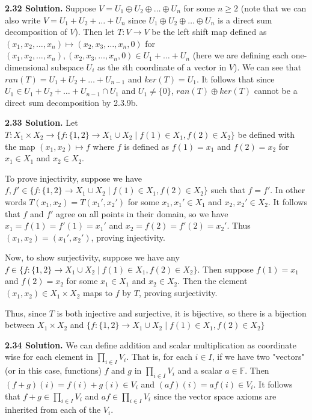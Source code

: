 \textbf{2.32 Solution.} Suppose $V = U_1 \oplus U_2 \oplus \ldots \oplus U_n$ for some $n \geq 2$ (note that we can also write $V = U_1 + U_2 + \ldots + U_n$ since $U_1 \oplus U_2 \oplus \ldots \oplus U_n$ is a direct sum decomposition of $V$). Then let $T: V \to V$ be the left shift map defined as $(x_1,x_2,\ldots,x_n) \mapsto (x_2,x_3,\ldots,x_n,0)$ for $(x_1,x_2,\ldots,x_n), (x_2,x_3,\ldots,x_n,0) \in U_1+\ldots+U_n$ (here we are defining each one-dimensional subspace $U_i$ as the $i$th coordinate of a vector in $V$). We can see that $ran(T) = U_1 + U_2 + \ldots + U_{n-1}$ and $ker(T) = U_1$. It follows that since $U_1 \in U_1 + U_2 + \ldots + U_{n-1} \cap U_1$ and $U_1 \neq \{0\}$, $ran(T) \oplus ker(T)$ cannot be a direct sum decomposition by 2.3.9b.

\textbf{2.33 Solution.} Let $T: X_1 \times X_2 \to \{f:\{1,2\}\to X_1 \cup X_2 \mid f(1) \in X_1, f(2) \in X_2\}$ be defined with the map $(x_1,x_2) \mapsto f$ where $f$ is defined as $f(1) = x_1$ and $f(2) = x_2$ for $x_1 \in X_1$ and $x_2 \in X_2$. 

To prove injectivity, suppose we have $f,f' \in \{f:\{1,2\}\to X_1 \cup X_2 \mid f(1) \in X_1, f(2) \in X_2\}$ such that $f = f'$. In other words $T(x_1,x_2) = T(x_1',x_2')$ for some $x_1,x_1' \in X_1$ and $x_2,x_2' \in X_2$. It follows that $f$ and $f'$ agree on all points in their domain, so we have $x_1 = f(1) = f'(1) = x_1'$ and $x_2 = f(2) = f'(2) = x_2'$. Thus $(x_1,x_2) = (x_1',x_2')$, proving injectivity.

Now, to show surjectivity, suppose we have any $f \in \{f:\{1,2\}\to X_1 \cup X_2 \mid f(1) \in X_1, f(2) \in X_2\}$. Then suppose $f(1) = x_1$ and $f(2) = x_2$ for some $x_1 \in X_1$ and $x_2 \in X_2$. Then the element $(x_1,x_2) \in X_1 \times X_2$ maps to $f$ by $T$, proving surjectivity.

Thus, since $T$ is both injective and surjective, it is bijective, so there is a bijection between $X_1 \times X_2$ and $\{f:\{1,2\}\to X_1 \cup X_2 \mid f(1) \in X_1, f(2) \in X_2\}$

\textbf{2.34 Solution.} We can define addition and scalar multiplication as coordinate wise for each element in $\prod_{i \in I}V_i$. That is, for each $i \in I$, if we have two "vectors" (or in this case, functions) $f$ and $g$ in $\prod_{i \in I}V_i$ and a scalar $a \in \mathbb{F}$. Then $(f+g)(i) = f(i) + g(i) \in V_i$ and $(af)(i) = af(i) \in V_i$. It follows that $f+g \in \prod_{i \in I}V_i$ and $af \in \prod_{i \in I}V_i$ since the vector space axioms are inherited from each of the $V_i$.

